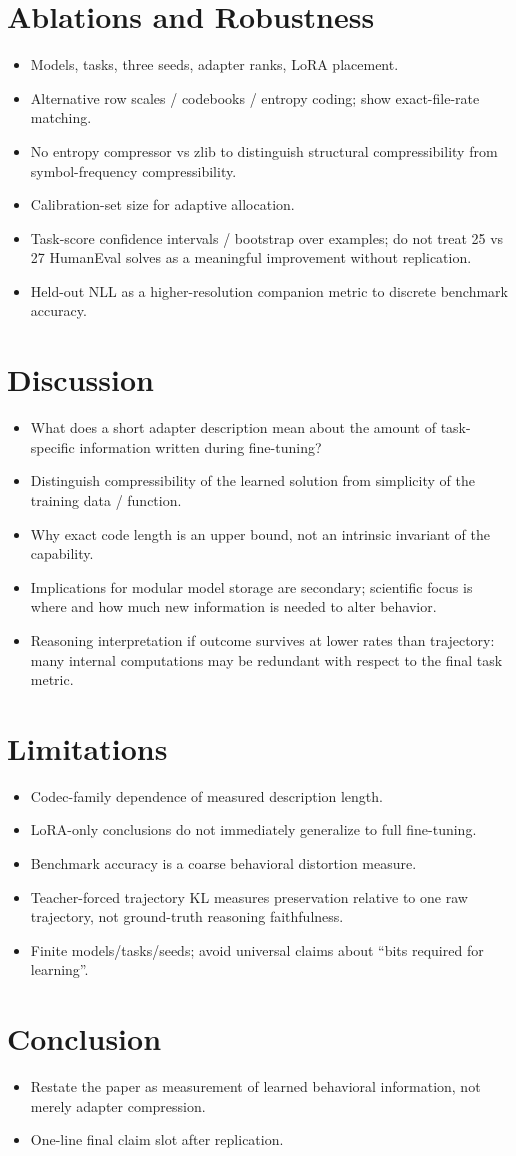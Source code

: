 \documentclass[10pt]{article}
\newcommand{\paperidea}[1]{\item #1}
\begin{document}
\section{Ablations and Robustness}
\begin{itemize}
  \paperidea{Models, tasks, three seeds, adapter ranks, LoRA placement.}
  \paperidea{Alternative row scales / codebooks / entropy coding; show exact-file-rate matching.}
  \paperidea{No entropy compressor vs zlib to distinguish structural compressibility from symbol-frequency compressibility.}
  \paperidea{Calibration-set size for adaptive allocation.}
  \paperidea{Task-score confidence intervals / bootstrap over examples; do not treat 25 vs 27 HumanEval solves as a meaningful improvement without replication.}
  \paperidea{Held-out NLL as a higher-resolution companion metric to discrete benchmark accuracy.}
\end{itemize}

\section{Discussion}
\begin{itemize}
  \paperidea{What does a short adapter description mean about the amount of task-specific information written during fine-tuning?}
  \paperidea{Distinguish compressibility of the learned solution from simplicity of the training data / function.}
  \paperidea{Why exact code length is an upper bound, not an intrinsic invariant of the capability.}
  \paperidea{Implications for modular model storage are secondary; scientific focus is where and how much new information is needed to alter behavior.}
  \paperidea{Reasoning interpretation if outcome survives at lower rates than trajectory: many internal computations may be redundant with respect to the final task metric.}
\end{itemize}

\section{Limitations}
\begin{itemize}
  \paperidea{Codec-family dependence of measured description length.}
  \paperidea{LoRA-only conclusions do not immediately generalize to full fine-tuning.}
  \paperidea{Benchmark accuracy is a coarse behavioral distortion measure.}
  \paperidea{Teacher-forced trajectory KL measures preservation relative to one raw trajectory, not ground-truth reasoning faithfulness.}
  \paperidea{Finite models/tasks/seeds; avoid universal claims about ``bits required for learning''.}
\end{itemize}

\section{Conclusion}
\begin{itemize}
  \paperidea{Restate the paper as measurement of learned behavioral information, not merely adapter compression.}
  \paperidea{One-line final claim slot after replication.}
\end{itemize}



\end{document}
